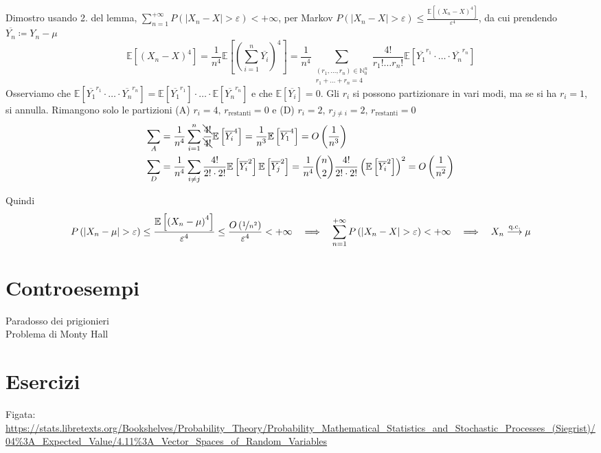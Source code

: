 \documentclass[a4paper,10pt]{article}
\theoremstyle{remark}
\theoremstyle{definition}
\begin{document}
Dimostro usando 2. del lemma, $\sum_{n=1}^{+\infty}P\left(\left|X_{n}-X\right|>\varepsilon\right)<+\infty$,
per Markov $P\left(\left|X_{n}-X\right|>\varepsilon\right)\leq\frac{\mathbb{E}\left[\left(X_{n}-X\right)^{4}\right]}{\varepsilon^{4}}$,
da cui prendendo $\overline{Y_{n}}\coloneqq Y_{n}-\mu$
\[
\mathbb{E}\left[\left(X_{n}-X\right)^{4}\right]=\frac{1}{n^{4}}\mathbb{E}\left[\left(\sum_{i=1}^{n}\overline{Y_{i}}\right)^{4}\right]=\frac{1}{n^{4}}\sum_{\begin{array}{c}
\left(r_{1},\dots,r_{n}\right)\in\mathbb{N}_{0}^{n}\\
r_{1}+\dots+r_{n}=4
\end{array}}\frac{4!}{r_{1}!\dots r_{n}!}\mathbb{E}\left[\overline{Y_{1}}^{r_{1}}\cdot\dots\cdot\overline{Y_{n}}^{r_{n}}\right]
\]
Osserviamo che $\mathbb{E}\left[\overline{Y_{1}}^{r_{1}}\cdot\dots\cdot\overline{Y_{n}}^{r_{n}}\right]=\mathbb{E}\left[\overline{Y_{1}}^{r_{1}}\right]\cdot\dots\cdot\mathbb{E}\left[\overline{Y_{n}}^{r_{n}}\right]$
e che $\mathbb{E}\left[\overline{Y_{i}}\right]=0$. Gli $r_{i}$ si
possono partizionare in vari modi, ma se si ha $r_{i}=1$, si annulla.
Rimangono solo le partizioni (A) $r_{i}=4,\,r_{\text{restanti}}=0$
e (D) $r_{i}=2,\,r_{j\neq i}=2,\,r_{\text{restanti}}=0$
\begin{align*}
\sum_{A} & =\frac{1}{n^{4}}\sum_{i=1}^{n}\frac{\bcancel{4!}}{\bcancel{4!}}\mathbb{E}\left[\overline{Y_{i}}^{4}\right]=\frac{1}{n^{3}}\mathbb{E}\left[\overline{Y_{1}}^{4}\right]=O\left(\frac{1}{n^{3}}\right)\\
\sum_{D} & =\frac{1}{n^{4}}\sum_{i\neq j}\frac{4!}{2!\cdot2!}\mathbb{E}\left[\overline{Y_{i}}^{2}\right]\mathbb{E}\left[\overline{Y_{j}}^{2}\right]=\frac{1}{n^{4}}\binom{n}{2}\frac{4!}{2!\cdot2!}\left(\mathbb{E}\left[\overline{Y_{i}}^{2}\right]\right)^{2}=O\left(\frac{1}{n^{2}}\right)
\end{align*}

Quindi
\[
P\left(\left|X_{n}-\mu\right|>\varepsilon\right)\leq\frac{\mathbb{E}\left[\left(X_{n}-\mu\right)^{4}\right]}{\varepsilon^{4}}\leq\frac{O\left(\nicefrac{1}{n^{2}}\right)}{\varepsilon^{4}}<+\infty\quad\Longrightarrow\quad\sum_{n=1}^{+\infty}P\left(\left|X_{n}-X\right|>\varepsilon\right)<+\infty\quad\Longrightarrow\quad X_{n}\overset{\text{q.c.}}{\longrightarrow}\mu
\]









\part{Controesempi}
\begin{description}
    \item[Paradosso dei prigionieri]
    \item[Problema di Monty Hall] 
\end{description}
\part{Esercizi}

Figata: \url{https://stats.libretexts.org/Bookshelves/Probability_Theory/Probability_Mathematical_Statistics_and_Stochastic_Processes_(Siegrist)/04%3A_Expected_Value/4.11%3A_Vector_Spaces_of_Random_Variables}
\end{document}
